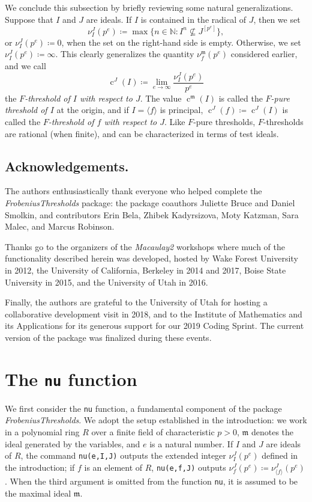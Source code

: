 \documentclass{amsart}
\newcommand{\ft}{\operatorname{c}}
\newcommand{\idealm}{\mathfrak{m}}
\begin{document}
We conclude this subsection by briefly reviewing some natural generalizations.
Suppose that $I$ and $J$ are ideals.
If $I$ is contained in the radical of $J$, then we set
%
\[ \nu_I^J(p^e) \coloneqq \max \{ n \in \mathbb{N}: I^n \not\subseteq J^{[p^e]} \}, \]
or $\nu_I^J(p^e) \coloneqq 0$, when the set on the right-hand side is empty.
Otherwise, we set $\nu_I^J(p^e) \coloneqq \infty$.
This clearly generalizes the quantity $\nu_f^{\idealm}(p^e)$ considered earlier, and we call
\[ \ft^J(I) \coloneqq  \lim_{e \to \infty} \frac{ \nu_I^J(p^e)}{p^e} \]
the \emph{$F$-threshold of $I$ with respect to $J$}. 
The value $\ft^{\idealm}(I)$ is called the \emph{$F$-pure threshold of $I$} at the origin, and if $I = \langle f \rangle$ is principal,  $\ft^{J}(f) \coloneqq  \ft^J(I)$ is called the \emph{$F$-threshold of $f$ with respect to $J$}.
Like $F$-pure thresholds, $F$-thresholds are rational (when finite), and can be characterized in terms of test ideals.

\subsection*{Acknowledgements.}  The authors enthusiastically thank everyone who helped complete the \emph{FrobeniusThresholds} package: the package coauthors Juliette Bruce and Daniel Smolkin, and contributors  Erin Bela, Zhibek Kadyrsizova, Moty Katzman, Sara Malec, and Marcus Robinson.

Thanks go to the organizers of the \emph{Macaulay2} workshops where much of the functionality described herein was developed, hosted by Wake Forest University in 2012, the University of California, Berkeley in 2014 and 2017, Boise State University in 2015, and the University of Utah in 2016.

Finally, the authors are grateful to the University of Utah for hosting a collaborative development visit in 2018, and to the Institute of Mathematics and its Applications for its generous support for our 2019 Coding Sprint.
The current version of the package was finalized during these events.

\section{The {\tt nu} function}
\label{sec.Nu}

We first consider the \texttt{nu} function, a fundamental component of the package \emph{FrobeniusThresholds}.
We adopt the setup established in the introduction: we work in a polynomial ring $R$ over a finite field of characteristic $p>0$,  $\idealm$ denotes the ideal generated by the variables, and $e$ is a natural number.
If $I$ and $J$ are ideals of $R$, the command \texttt{nu(e,I,J)} outputs the extended integer $\nu_I^J(p^e)$ defined in the introduction; if $f$ is an element of $R$, \texttt{nu(e,f,J)} outputs $\nu_f^J(p^e) \coloneqq \nu_{\langle f \rangle}^J(p^e)$.
When the third argument is omitted from the function \texttt{nu}, it is assumed to be the maximal ideal $\idealm$.
\end{document}
